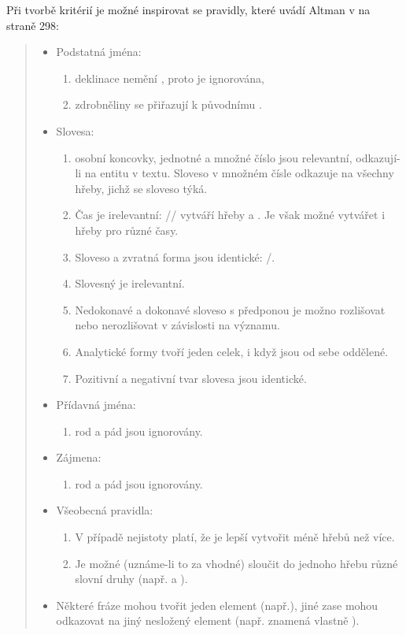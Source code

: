 \documentclass[dp.tex]{subfiles}
\begin{document}
Při tvorbě kritérií je možné inspirovat se pravidly, které uvádí Altman v \cite{Wimmer2003} na straně 298:
\begin{quote}
\begin{itemize}
\item Podstatná jména:
\begin{enumerate}
\item deklinace nemění  , proto je ignorována,
\item zdrobněliny se přiřazují k původnímu .
\end{enumerate}
\item Slovesa:
\begin{enumerate}
\item osobní koncovky, jednotné a množné číslo jsou relevantní, odkazují-li na entitu v textu. Sloveso v množném čísle odkazuje na všechny hřeby, jichž se sloveso týká.
\item Čas je irelevantní: // vytváří hřeby  a . Je však možné vytvářet i hřeby pro různé časy.
\item Sloveso a zvratná forma jsou identické: /.
\item Slovesný  je irelevantní.
\item Nedokonavé a dokonavé sloveso s předponou je možno rozlišovat nebo nerozlišovat v závislosti na významu.
\item Analytické formy tvoří jeden celek, i když jsou od sebe oddělené.
\item Pozitivní a negativní tvar slovesa jsou identické.
\end{enumerate}
\item Přídavná jména:
\begin{enumerate}
\item rod a pád jsou ignorovány.
\end{enumerate}
\item Zájmena:
\begin{enumerate}
\item rod a pád jsou ignorovány.
\end{enumerate}
\item Všeobecná pravidla:
\begin{enumerate}
\item V případě nejistoty platí, že je lepší vytvořit méně hřebů než více.
\item Je možné (uznáme-li to za vhodné) sloučit do jednoho hřebu různé slovní druhy (např.  a ).
\end{enumerate}
\item Některé fráze mohou tvořit jeden element (např.), jiné zase mohou odkazovat na jiný nesložený element (např.  znamená vlastně ).
\end{itemize}
\end{quote}
\end{document}
